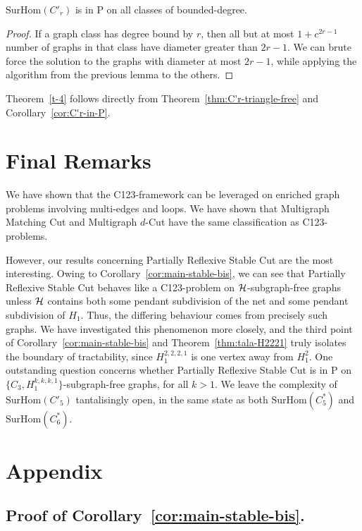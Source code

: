 \documentclass[a4paper,UKenglish,cleveref, autoref,thm-restate]{lipics-v2021}
\newcommand{\SurHom}{\ensuremath{\mathrm{SurHom}}}
\begin{document}
\begin{corollary}
    \SurHom$(C'_r)$ is in P on all classes of bounded-degree.
    \label{cor:C'r-in-P}
\end{corollary}
\begin{proof}
    If a graph class has degree bound by $r$, then all but at most $1+c^{2r-1}$ number of graphs in that class have diameter greater than $2r-1$. We can brute force the solution to the graphs with diameter at most $2r-1$, while applying the algorithm from the previous lemma to the others.
\end{proof}
Theorem~\ref{t-4} follows directly from Theorem~\ref{thm:C'r-triangle-free} and Corollary~\ref{cor:C'r-in-P}.

\section{Final Remarks}\label{s-con}

We have shown that the C123-framework can be leveraged on enriched graph problems involving multi-edges and loops. We have shown that {\sc Multigraph Matching Cut} and {\sc Multigraph $d$-Cut} have the same classification as C123-problems.

However, our results concerning {\sc Partially Reflexive Stable Cut} are the most interesting. Owing to Corollary~\ref{cor:main-stable-bis}, we can see that {\sc Partially Reflexive Stable Cut} behaves like a C123-problem on ${\cal H}$-subgraph-free graphs unless ${\cal H}$ contains both some pendant subdivision of the net and some pendant subdivision of $H_1$. Thus, the differing behaviour comes from precisely such graphs. We have investigated this phenomenon more closely, and the third point of Corollary~\ref{cor:main-stable-bis} and Theorem~\ref{thm:tala-H2221} truly isolates the boundary of tractability, since $H^{2,2,2,1}_1$ is one vertex away from $H^2_1$. One outstanding question concerns whether {\sc Partially Reflexive Stable Cut} is in P on $\{C_3,H^{k,k,k,1}_1\}$-subgraph-free graphs, for all $k>1$.
We leave the complexity of $\SurHom(C'_5)$ tantalisingly open, in the same state as both $\SurHom(C^*_5)$ and $\SurHom(C^*_6)$.

%


\section*{Appendix}

\subsection{Proof of Corollary~\ref{cor:main-stable-bis}.}
\end{document}
